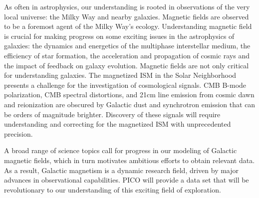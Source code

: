 \documentclass[PICOReport.tex]{subfiles}
\begin{document}
As often in astrophysics, our understanding is rooted in 
observations of the very local universe: the Milky Way and nearby galaxies. Magnetic fields are observed to be a foremost agent of the 
Milky Way's ecology. Understanding magnetic field is crucial for making progress on some exciting issues in the astrophysics of galaxies: the dynamics and 
energetics of the multiphase interstellar medium, the efficiency of star formation, the acceleration and propagation of cosmic rays and the 
impact of feedback on galaxy evolution. Magnetic fields are not only critical for understanding galaxies. 
The magnetized ISM in the Solar Neighborhood presents a challenge for the investigation of cosmological signals. 
CMB B-mode polarization, CMB spectral distortions, and 21cm line emission from cosmic dawn and reionization are obscured by Galactic dust and synchrotron emission that can be orders of magnitude brighter. Discovery of these signals will require understanding and correcting for the magnetized ISM with unprecedented precision.

A broad range of science topics call for progress in our modeling of Galactic magnetic fields, which in turn 
motivates ambitious efforts to obtain relevant data. 
As a result, Galactic magnetism is a dynamic research field, driven by major advances in observational capabilities.
PICO will provide a data set that will be revolutionary to our understanding of this exciting field of exploration.
\end{document}
